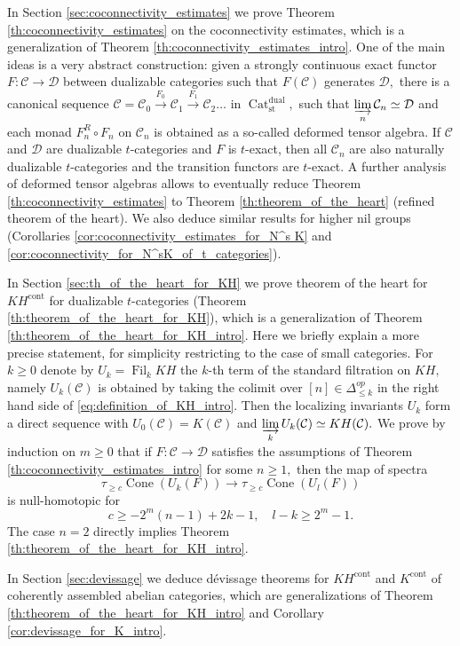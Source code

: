 \documentclass[11pt,leqno]{amsart}
\numberwithin{equation}{section}
\newcommand{\indlim}[1][]{\mathop{\varinjlim}\limits_{#1}}
\newcommand{\xto}{\xrightarrow}
\newcommand{\Cat}{\operatorname{Cat}}
\newcommand{\Cone}{\operatorname{Cone}}
\newcommand{\cont}{\operatorname{cont}}
\newcommand{\st}{\operatorname{st}}
\newcommand{\dual}{\operatorname{dual}}
\newcommand{\Fil}{\operatorname{Fil}}
\newcommand{\cD}{{\mathcal D}}
\newcommand{\cC}{{\mathcal C}}
\begin{document}
In Section \ref{sec:coconnectivity_estimates} we prove Theorem \ref{th:coconnectivity_estimates} on the coconnectivity estimates, which is a generalization of Theorem \ref{th:coconnectivity_estimates_intro}. One of the main ideas is a very abstract construction: given a strongly continuous exact functor $F:\cC\to\cD$ between dualizable categories such that $F(\cC)$ generates $\cD,$ there is a canonical sequence $\cC=\cC_0\xto{F_0}\cC_1\xto{F_1}\cC_2\dots$ in $\Cat_{\st}^{\dual},$ such that $\indlim[n]\cC_n\simeq\cD$ and each monad $F_n^R\circ F_n$ on $\cC_n$ is obtained as a so-called deformed tensor algebra. If $\cC$ and $\cD$ are dualizable $t$-categories and $F$ is $t$-exact, then all $\cC_n$ are also naturally dualizable $t$-categories and the transition functors are $t$-exact. A further analysis of deformed tensor algebras allows to eventually reduce Theorem \ref{th:coconnectivity_estimates} to Theorem \ref{th:theorem_of_the_heart} (refined theorem of the heart). We also deduce similar results for higher nil groups (Corollaries \ref{cor:coconnectivity_estimates_for_N^s K} and \ref{cor:coconnectivity_for_N^sK_of_t_categories}).

In Section \ref{sec:th_of_the_heart_for_KH} we prove theorem of the heart for $KH^{\cont}$ for dualizable $t$-categories (Theorem \ref{th:theorem_of_the_heart_for_KH}), which is a generalization of Theorem \ref{th:theorem_of_the_heart_for_KH_intro}. Here we briefly explain a more precise statement, for simplicity restricting to the case of small categories. For $k\geq 0$ denote by $U_k=\Fil_k KH$ the $k$-th term of the standard filtration on $KH,$ namely $U_k(\cC)$ is obtained by taking the colimit over $[n]\in\Delta_{\leq k}^{op}$ in the right hand side of \eqref{eq:definition_of_KH_intro}. Then the localizing invariants $U_k$ form a direct sequence with $U_0(\cC)=K(\cC)$ and $\indlim[k]U_k(\cC) \simeq KH(\cC).$ We prove by induction on $m\geq 0$ that if $F:\cC\to\cD$ satisfies the assumptions of Theorem \ref{th:coconnectivity_estimates_intro} for some $n\geq 1,$ then the map of spectra
\begin{equation*}
\tau_{\geq c}\Cone(U_k(F))\to \tau_{\geq c}\Cone(U_l(F))
\end{equation*}  
is null-homotopic for
\begin{equation*}
c\geq -2^m(n-1)+2k-1,\quad l-k\geq 2^m-1.
\end{equation*}
The case $n=2$ directly implies Theorem \ref{th:theorem_of_the_heart_for_KH_intro}.

In Section \ref{sec:devissage} we deduce d\'evissage theorems for $KH^{\cont}$ and $K^{\cont}$ of coherently assembled abelian categories, which are generalizations of Theorem \ref{th:theorem_of_the_heart_for_KH_intro} and Corollary \ref{cor:devissage_for_K_intro}.
\end{document}
